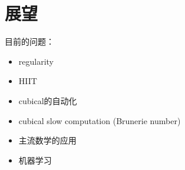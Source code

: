 \chapter{展望}
目前的问题：
\begin{itemize}
\item regularity
\item HIIT
\item cubical的自动化
\item cubical slow computation (Brunerie number)
\item 主流数学的应用
\item 机器学习
\end{itemize}
